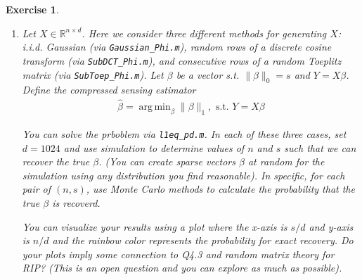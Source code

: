 \documentclass[12pt]{article}
\DeclareMathOperator*{\argmin}{arg\,min}
\theoremstyle{colon}
\newtheorem{exercise}{Exercise}
\begin{document}
\begin{exercise}
\begin{enumerate}[label=\arabic*)]
      \textbf{Step 1:} Let $s$ and $d$ satisfying $s < d/2$ be given. Prove that there exists a set
      \begin{gather*}
        \mathcal{X} \subseteq U = \{x \in \{0,+1,-1\}^d : \lVert x \rVert_0 = s\}
      \end{gather*}
      such that for any $x,z \in \mathcal{X}$ with $x \neq z$ we have
      \begin{gather*}
        \lVert x - z \rVert_2 \geq \sqrt{s/2} \text{ and } \log \lvert \mathcal{X} \rvert \geq \frac{s}{2} \log \left( \frac{d}{s} \right)
      \end{gather*}
      You can construct your set by adding points in $U$ one by one and make sure there are points $z$'s that have not been added so far satisfying $\lVert x - z \rVert_2 \geq \sqrt{s/2}$ for $x$'s that have already been added. You need to bound the number of these possible $z$'s if $m$ of $x$'s have been added until you find that it is impossible to find another such $z$. Then you can find the lower bound of $\lvert \mathcal{X} \rvert$.

      \textbf{Step 2:} For any pair of $x,z \in \mathcal{X}$, the balls centered at $Ax, Az$ with radius $\sqrt{s/16}$ are disjoint.

      \textbf{Step 3:} Prove the problem using Step 1 and Step 2. (\textbf{Hint:} Find a larger ball containing all balls in Step 2. Use the fact that the volume of this larger ball is bigger than the sum of the smaller balls in Step 2.)

    \item Let $X \in \mathbb{R}^{n \times d}$. Here we consider three different methods for generating $X$: i.i.d. Gaussian (via \texttt{Gaussian\_Phi.m}), random rows of a discrete cosine transform (via \texttt{SubDCT\_Phi.m}), and consecutive rows of a random Toeplitz matrix (via \texttt{SubToep\_Phi.m}). Let $\beta$ be a vector s.t. $\lVert \beta \rVert_0 = s$ and $Y = X \beta$. Define the compressed sensing estimator
      \begin{gather*}
        \hat{\beta} = \argmin_\beta \lVert \beta \rVert_1, \text{ s.t. } Y = X \beta
      \end{gather*}

      You can solve the prboblem via \texttt{l1eq\_pd.m}. In each of these three cases, set $d=1024$ and use simulation to determine values of $n$ and $s$ such that we can recover the true $\beta$. (You can create sparse vectors $\beta$ at random for the simulation using any distribution you find reasonable). In specific, for each pair of $(n,s)$, use Monte Carlo methods to calculate the probability that the true $\beta$ is recoverd.

      You can visualize your results using a plot where the x-axis is $s/d$ and y-axis is $n/d$ and the rainbow color represents the probability for exact recovery. Do your plots imply some connection to Q4.3 and random matrix theory for RIP? (This is an open question and you can explore as much as possible).
  \end{enumerate}
\end{exercise}
\end{document}
